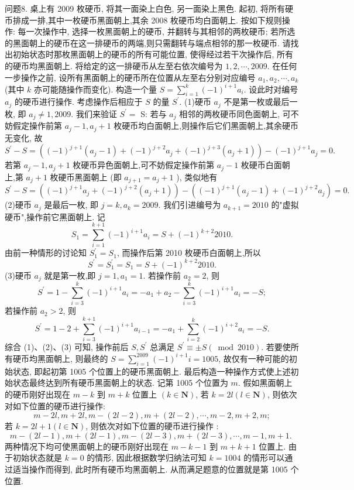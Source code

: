 问题8. 桌上有 2009 枚硬币, 将其一面染上白色, 另一面染上黑色.
起初, 将所有硬币排成一排,其中一枚硬币黑面朝上,其余 2008 枚硬币均白面朝上.
按如下规则操作: 每一次操作中, 选择一枚黑面朝上的硬币, 并翻转与其相邻的两枚硬币; 若所选的黑面朝上的硬币在这一排硬币的两端,则只需翻转与端点相邻的那一枚硬币.
请找出初始状态时那枚黑面朝上的硬币的所有可能位置, 使得经过若干次操作后, 所有的硬币均黑面朝上.
将给定的这一排硬币从左至右依次编号为 $1,2, \cdots, 2009$.
在任何一步操作之前, 设所有黑面朝上的硬币所在位置从左至右分别对应编号 $a_1, a_2, \cdots, a_k$ (其中 $k$ 亦可能随操作而变化).
构造一个量 $S=\sum_{i=1}^k(-1)^{i+1} a_i$.
设此时对编号 $a_j$ 的硬币进行操作.
考虑操作后相应于 $S$ 的量 $S^{\prime}$.
(1)硬币 $a_j$ 不是第一枚或最后一枚, 即 $a_j \neq 1,2009$. 我们来验证 $S^{\prime}=$ S:
若与 $a_j$ 相邻的两枚硬币同色面朝上, 可不妨假定操作前第 $a_j-1, a_j+1$ 枚硬币均白面朝上,则操作后它们黑面朝上,其余硬币无变化, 故
$$
S^{\prime}-S=\left((-1)^{j+1}\left(a_j-1\right)+(-1)^{j+2} a_j+(-1)^{j+3}\left(a_j+1\right)\right)-(-1)^{j+1} a_j=0 .
$$
若第 $a_j-1, a_j+1$ 枚硬币异色面朝上,可不妨假定操作前第 $a_j-1$ 枚硬币白面朝上,第 $a_j+1$ 枚硬币黑面朝上 (即 $a_{j+1}=a_j+1$ ), 类似地有
$$
S^{\prime}-S=\left((-1)^{j+1} a_j+(-1)^{j+2}\left(a_j+1\right)\right)-\left((-1)^{j+1}\left(a_j-1\right)+(-1)^{j+2} a_j\right)=0 .
$$
(2)硬币 $a_j$ 是最后一枚, 即 $j=k, a_k=2009$.
我们引进编号为 $a_{k+1}=2010$ 的"虚拟硬币",操作前它黑面朝上.
记
$$
S_1=\sum_{i=1}^{k+1}(-1)^{i+1} a_i=S+(-1)^{k+2} 2010 .
$$
由前一种情形的讨论知 $S_1^{\prime}=S_1$, 而操作后第 2010 枚硬币白面朝上,所以
$$
S^{\prime}=S_1^{\prime}=S_1=S+(-1)^{k+2} 2010 .
$$
(3)硬币 $a_j$ 就是第一枚,即 $j=1, a_1=1$.
若操作前 $a_2=2$, 则
$$
S^{\prime}=1-\sum_{i=3}^k(-1)^{i+1} a_i=-a_1+a_2-\sum_{i=3}^k(-1)^{i+1} a_i=-S ;
$$
若操作前 $a_2>2$, 则
$$
S^{\prime}=1-2+\sum_{i=3}^{k+1}(-1)^{i+1} a_{i-1}=-a_1+\sum_{i=2}^k(-1)^{i+2} a_i=-S .
$$
综合 (1)、(2)、(3) 可知, 操作前后 $S, S^{\prime}$ 总满足 $S^{\prime} \equiv \pm S(\bmod 2010)$. 若要使所有硬币均黑面朝上, 则最终的 $S=\sum_{i=1}^{2009}(-1)^{i+1} i=1005$, 故仅有一种可能的初始状态, 即起初第 1005 个位置上的硬币黑面朝上.
最后构造一种操作方式使上述初始状态最终达到所有硬币黑面朝上的状态.
记第 1005 个位置为 $m$. 假如黑面朝上的硬币刚好出现在 $m-k$ 到 $m+k$ 位置上 $(k \in \mathbf{N})$, 若 $k=2 l(l \in \mathbf{N})$, 则依次对如下位置的硬币进行操作:
$$
m-2 l, m+2 l, m-(2 l-2), m+(2 l-2), \cdots, m-2, m+2, m ;
$$
若 $k=2 l+1(l \in \mathbf{N})$, 则依次对如下位置的硬币进行操作 :
$$
m-(2 l-1), m+(2 l-1), m-(2 l-3), m+(2 l-3), \cdots, m-1, m+1 \text {. }
$$
两种情况下均可使黑面朝上的硬币刚好出现在 $m-k-1$ 到 $m+k+1$ 位置上.
由于初始状态就是 $k=0$ 的情形, 因此根据数学归纳法可知 $k=1004$ 的情形可以通过适当操作而得到, 此时所有硬币均黑面朝上.
从而满足题意的位置就是第 1005 个位置.


